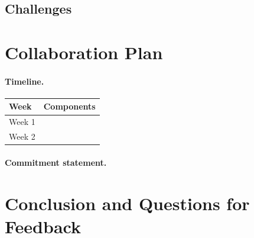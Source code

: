 \documentclass[12pt, letterpaper]{article}
\begin{document}
\subsection{Challenges}

\section{Collaboration Plan}

\paragraph{Timeline.}

\begin{tabular}{ll}
  \textbf{Week} & \textbf{Components} \\
  \hline
  Week 1 & \\
  Week 2 & \\
\end{tabular}

\paragraph{Commitment statement.}


\section{Conclusion and Questions for Feedback}





\end{document}

